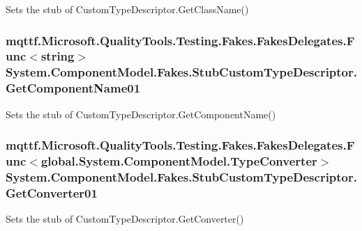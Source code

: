 Sets the stub of Custom\-Type\-Descriptor.\-Get\-Class\-Name()

\hypertarget{class_system_1_1_component_model_1_1_fakes_1_1_stub_custom_type_descriptor_a8809ed49afda696d0256fd384233e8d6}{
\subsubsection[{Get\-Component\-Name01}]{\setlength{\rightskip}{0pt plus 5cm}mqttf.\-Microsoft.\-Quality\-Tools.\-Testing.\-Fakes.\-Fakes\-Delegates.\-Func$<$string$>$ System.\-Component\-Model.\-Fakes.\-Stub\-Custom\-Type\-Descriptor.\-Get\-Component\-Name01}}\label{class_system_1_1_component_model_1_1_fakes_1_1_stub_custom_type_descriptor_a8809ed49afda696d0256fd384233e8d6}


Sets the stub of Custom\-Type\-Descriptor.\-Get\-Component\-Name()

\hypertarget{class_system_1_1_component_model_1_1_fakes_1_1_stub_custom_type_descriptor_a38be930ded249613dbd1d02e4597b21f}{
\subsubsection[{Get\-Converter01}]{\setlength{\rightskip}{0pt plus 5cm}mqttf.\-Microsoft.\-Quality\-Tools.\-Testing.\-Fakes.\-Fakes\-Delegates.\-Func$<$global.\-System.\-Component\-Model.\-Type\-Converter$>$ System.\-Component\-Model.\-Fakes.\-Stub\-Custom\-Type\-Descriptor.\-Get\-Converter01}}\label{class_system_1_1_component_model_1_1_fakes_1_1_stub_custom_type_descriptor_a38be930ded249613dbd1d02e4597b21f}


Sets the stub of Custom\-Type\-Descriptor.\-Get\-Converter()

